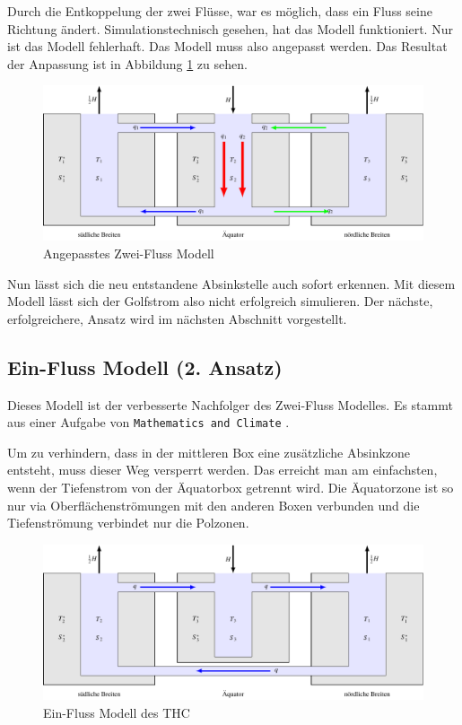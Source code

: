 Durch die Entkoppelung der zwei Flüsse, war es möglich, dass ein Fluss seine Richtung ändert.
Simulationstechnisch gesehen, hat das Modell funktioniert. Nur ist das Modell fehlerhaft. Das Modell muss also angepasst werden. Das Resultat der Anpassung ist in Abbildung \ref{thermohalin:3b2f-inverted} zu sehen.

\begin{figure}
	\centering
	\includegraphics[width=14cm]{thermohalin/tikz/3b2f-inverted.pdf}
	\caption{Angepasstes Zwei-Fluss Modell}
	\label{thermohalin:3b2f-inverted}
\end{figure}

Nun lässt sich die neu entstandene Absinkstelle auch sofort erkennen. 
Mit diesem Modell lässt sich der Golfstrom also nicht erfolgreich simulieren. 
Der nächste, erfolgreichere, Ansatz wird im nächsten Abschnitt vorgestellt.

\subsection{Ein-Fluss Modell (2. Ansatz)} 

Dieses Modell ist der verbesserte Nachfolger des Zwei-Fluss Modelles.
Es stammt aus einer Aufgabe von \texttt{Mathematics and Climate} \cite{skript:kaperengler}.

Um zu verhindern, dass in der mittleren Box eine zusätzliche Absinkzone entsteht, muss dieser Weg versperrt werden. Das erreicht man am einfachsten, wenn der Tiefenstrom von der Äquatorbox getrennt wird. Die Äquatorzone ist so nur via Oberflächenströmungen mit den anderen Boxen verbunden und die Tiefenströmung verbindet nur die Polzonen.


\begin{figure}
	\centering
	\includegraphics[width=14cm]{thermohalin/tikz/3b1f.pdf}
	\caption{Ein-Fluss Modell des THC}
	\label{thermohalin:3b1f}
\end{figure}

